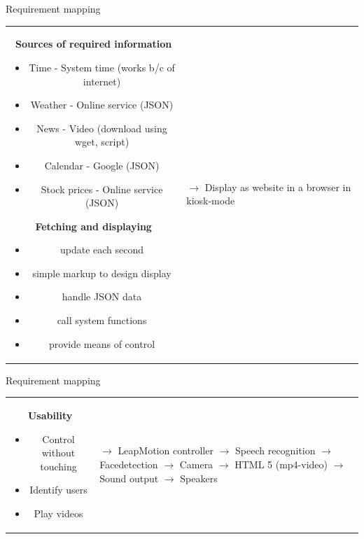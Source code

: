 \documentclass[xcolor=svgnames,handout,aspectratio=169]{beamer}
\begin{document}
\begin{frame}
	{Requirement mapping}
	
	\begin{tabular}{cl}  
			\parbox{0.6\linewidth}{
				\textbf{Sources of required information}
				\begin{itemize}
					\item Time - System time (works b/c of internet)
					\item Weather - Online service (JSON)
					\item News - Video (download using wget, script)
					\item Calendar - Google (JSON)
					\item Stock prices - Online service (JSON)
				\end{itemize}
				
				\textbf{Fetching and displaying}
				\begin{itemize}
					\item update each second
					\item simple markup to design display
					\item handle JSON data
					\item call system functions
					\item provide means of control 
				\end{itemize}
			}
		&
			\parbox{0.4\linewidth}{
				$\rightarrow$ Display as website in a browser in kiosk-mode
			}
	\end{tabular}
\end{frame}

\begin{frame}
	{Requirement mapping}
	\begin{tabular}{cl}  
			\parbox{0.6\linewidth}{
				\textbf{Usability}
				\begin{itemize}
					\item Control without touching
					\item Identify users
					\item Play videos
				\end{itemize}
			}
		&
			\parbox{0.4\linewidth}{
				$\rightarrow$ LeapMotion controller\\
				$\rightarrow$ Speech recognition\\
				$\rightarrow$ Facedetection $\rightarrow$ Camera\\
				$\rightarrow$ HTML 5 (mp4-video)\\
				$\rightarrow$ Sound output $\rightarrow$ Speakers
			}
	\end{tabular}	
\end{frame}
\end{document}
